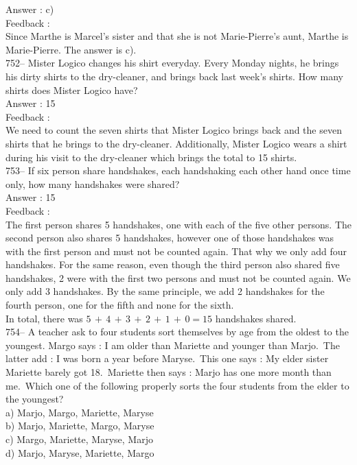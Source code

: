 \documentclass[letterpaper, 12pt]{article}
\begin{document}
Answer : c)\\

Feedback : \\
Since Marthe is Marcel's sister and that she is not Marie-Pierre's aunt, Marthe is Marie-Pierre.  The answer is c).\\

752-- Mister Logico changes his shirt everyday. Every Monday nights, he brings his dirty shirts to the dry-cleaner, and brings back last week's shirts. How many shirts does Mister Logico have?\\

Answer : 15\\

Feedback : \\
We need to count the seven shirts that Mister Logico brings back and the seven shirts that he brings to the dry-cleaner. Additionally, Mister Logico wears a shirt during his visit to the dry-cleaner which brings the total to 15 shirts.\\

753-- If six person share handshakes, each handshaking each other hand once time only, how many handshakes were shared?\\

Answer : 15\\

Feedback : \\
The first person shares 5 handshakes, one with each of the five other persons. The second person also shares 5 handshakes, however one of those handshakes was with the first person and must not be counted again. That why we only add four handshakes. For the same reason, even though the third person also shared five handshakes, 2 were with the first two persons and must not be counted again. We only add 3 handshakes.  By the same principle, we add 2 handshakes for the fourth person, one for the fifth and none for the sixth.\\
In total, there was $5\,+\,4\,+\,3\,+\,2\,+\,1\,+\,0=15$ handshakes shared.\\

754-- A teacher ask to four students sort themselves by age from the oldest to the youngest. Margo says : \og I am older than Mariette and younger than Marjo.\fg\  The latter add : \og I was born a year before Maryse.\fg\  This one says : \og My elder sister Mariette barely got 18.\fg\ Mariette then says : \og Marjo has one more month than me.\fg\ Which one of the following properly sorts the four students from the elder to the youngest?\\
a) Marjo, Margo, Mariette, Maryse\\
b) Marjo, Mariette, Margo, Maryse\\
c) Margo, Mariette, Maryse, Marjo\\
d) Marjo, Maryse, Mariette, Margo\\
\end{document}
